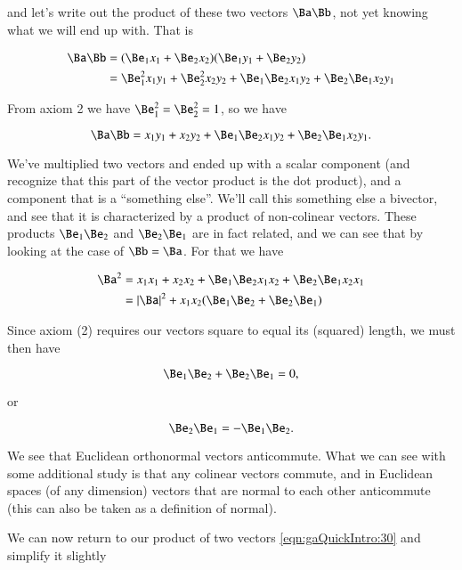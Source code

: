 and let's write out the product of these two vectors $\Ba \Bb$, not yet knowing what we will end up with.  That is

\begin{align*}
\Ba \Bb 
&= (\Be_1 x_1 + \Be_2 x_2 )( \Be_1 y_1 + \Be_2 y_2 ) \\
&= \Be_1^2 x_1 y_1 + \Be_2^2 x_2 y_2
+ \Be_1 \Be_2 x_1 y_2 + \Be_2 \Be_1 x_2 y_1
\end{align*}

From axiom 2 we have $\Be_1^2 = \Be_2^2 = 1$, so we have

\begin{equation}\label{eqn:gaQuickIntro:30}
\Ba \Bb = x_1 y_1 + x_2 y_2 + \Be_1 \Be_2 x_1 y_2 + \Be_2 \Be_1 x_2 y_1.
\end{equation}

We've multiplied two vectors and ended up with a scalar component (and recognize that this part of the vector product is the dot product), and a component that is a ``something else''.  We'll call this something else a bivector, and see that it is characterized by a product of non-colinear vectors.  These products $\Be_1 \Be_2$ and $\Be_2 \Be_1$ are in fact related, and we can see that by looking at the case of $\Bb = \Ba$.  For that we have

\begin{align*}
\Ba^2 
&=
x_1 x_1 + x_2 x_2 + \Be_1 \Be_2 x_1 x_2 + \Be_2 \Be_1 x_2 x_1 \\
&=
\Abs{\Ba}^2 +
x_1 x_2 ( \Be_1 \Be_2 + \Be_2 \Be_1 )
\end{align*}

Since axiom (2) requires our vectors square to equal its (squared) length, we must then have

\begin{equation}\label{eqn:gaQuickIntro:50}
\Be_1 \Be_2 + \Be_2 \Be_1 = 0,
\end{equation}

or

\begin{equation}\label{eqn:gaQuickIntro:70}
\Be_2 \Be_1 = -\Be_1 \Be_2.
\end{equation}

We see that Euclidean orthonormal vectors anticommute.  What we can see with some additional study is that any colinear vectors commute, and in Euclidean spaces (of any dimension) vectors that are normal to each other anticommute (this can also be taken as a definition of normal).

We can now return to our product of two vectors \ref{eqn:gaQuickIntro:30} and simplify it slightly

